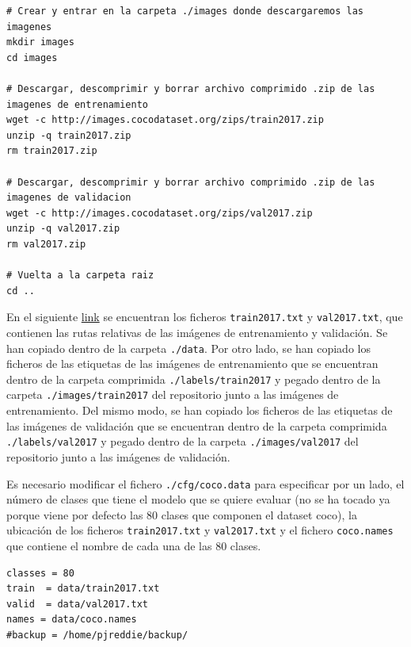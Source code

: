 \vspace{0.5cm}
\begin{lstlisting}[language=iPython,caption=Evaluación de las métricas de calidad de MS COCO en YOLOv4 Darknet (2),captionpos=b,label={lst:evaluate-cocodataset2}]
# Crear y entrar en la carpeta ./images donde descargaremos las imagenes
mkdir images
cd images

# Descargar, descomprimir y borrar archivo comprimido .zip de las imagenes de entrenamiento
wget -c http://images.cocodataset.org/zips/train2017.zip
unzip -q train2017.zip
rm train2017.zip

# Descargar, descomprimir y borrar archivo comprimido .zip de las imagenes de validacion
wget -c http://images.cocodataset.org/zips/val2017.zip
unzip -q val2017.zip
rm val2017.zip

# Vuelta a la carpeta raiz
cd ..
\end{lstlisting}

En el siguiente \href{https://drive.google.com/drive/folders/1KLf2PTMwPmopPxPdFLtx-nAPpdlcT-NF?usp=sharing}{link} se encuentran los ficheros \texttt{train2017.txt} y \texttt{val2017.txt}, que contienen las rutas relativas de las imágenes de entrenamiento y validación. Se han copiado dentro de la carpeta \texttt{./data}. Por otro lado, se han copiado los ficheros de las etiquetas de las imágenes de entrenamiento que se encuentran dentro de la carpeta comprimida \texttt{./labels/train2017} y pegado dentro de la carpeta \texttt{./images/train2017} del repositorio junto a las imágenes de entrenamiento. Del mismo modo, se han copiado los ficheros de las etiquetas de las imágenes de validación que se encuentran dentro de la carpeta comprimida \texttt{./labels/val2017} y pegado dentro de la carpeta \texttt{./images/val2017} del repositorio junto a las imágenes de validación.

Es necesario modificar el fichero \texttt{./cfg/coco.data} para especificar por un lado, el número de clases que tiene el modelo que se quiere evaluar (no se ha tocado ya porque viene por defecto las 80 clases que componen el dataset \gls{coco}), la ubicación de los ficheros \texttt{train2017.txt} y \texttt{val2017.txt} y el fichero \texttt{coco.names} que contiene el nombre de cada una de las 80 clases.

\vspace{0.5cm}
\begin{lstlisting}[language=iPython,caption=Fichero coco.data,captionpos=b,label={lst:coco-data-file}]
classes = 80
train  = data/train2017.txt
valid  = data/val2017.txt
names = data/coco.names
#backup = /home/pjreddie/backup/
\end{lstlisting}

